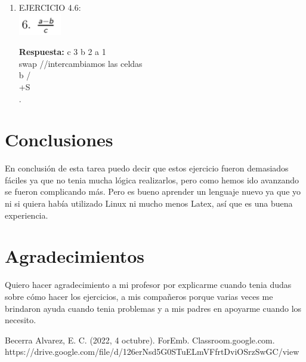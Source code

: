 \documentclass[conference]{IEEEtran}
\begin{document}
\begin{enumerate}
\item EJERCICIO 4.6: \\
	\includegraphics{e4.6}
	\begin{center}
	\textbf{Respuesta: } c 3 b 2 a 1 \\ swap //intercambiamos las celdas \\ b / \\ +S \\ . \\ 
	\end{center}	
	
\end{enumerate}

\section{Conclusiones}  
En conclusión de esta tarea puedo decir que estos ejercicio fueron demasiados fáciles ya que no tenia mucha lógica realizarlos, pero como hemos ido avanzando se fueron complicando más. Pero es bueno aprender un lenguaje nuevo ya que yo ni si quiera había utilizado Linux ni mucho menos Latex, así que es una buena experiencia.

\section*{Agradecimientos}
Quiero hacer agradecimiento a mi profesor por explicarme cuando tenia dudas sobre cómo hacer los ejercicios, a mis compañeros porque varias veces me brindaron ayuda cuando tenia problemas y a mis padres en apoyarme cuando los necesito.

\begin{thebibliography}{00}
 Becerra Alvarez, E. C. (2022, 4 octubre). ForEmb. Classroom.google.com. https://drive.google.com/file/d/126erNsd5G0STuELmVFfrtDviOSrzSwGC/view
\end{thebibliography}
\end{document}
